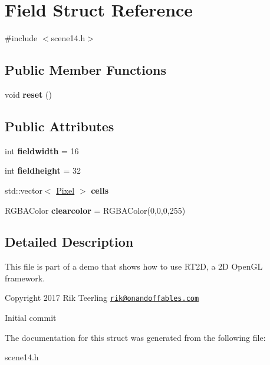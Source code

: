 \hypertarget{struct_field}{}\section{Field Struct Reference}
\label{struct_field}


{\ttfamily \#include $<$scene14.\+h$>$}

\subsection*{Public Member Functions}
\begin{DoxyCompactItemize}
\item 
\mbox{\label{struct_field_a63b8fdd184f4afe1adf143dbde54a57f}} 
void {\bfseries reset} ()
\end{DoxyCompactItemize}
\subsection*{Public Attributes}
\begin{DoxyCompactItemize}
\item 
\mbox{\label{struct_field_aa5e55573ae91de84b5b2a824cacde3c9}} 
int {\bfseries fieldwidth} = 16
\item 
\mbox{\label{struct_field_a2cac92d1bbaabf1fff016b26a5739844}} 
int {\bfseries fieldheight} = 32
\item 
\mbox{\label{struct_field_aa2e60e66a576bf6f5a447a476ebe2ec4}} 
std\+::vector$<$ \hyperlink{struct_pixel}{Pixel} $>$ {\bfseries cells}
\item 
\mbox{\label{struct_field_a5d846e0822373c2635406a1ed90201d9}} 
R\+G\+B\+A\+Color {\bfseries clearcolor} = R\+G\+B\+A\+Color(0,0,0,255)
\end{DoxyCompactItemize}


\subsection{Detailed Description}
This file is part of a demo that shows how to use R\+T2D, a 2D Open\+GL framework.


\begin{DoxyItemize}
\item Copyright 2017 Rik Teerling \href{mailto:rik@onandoffables.com}{\tt rik@onandoffables.\+com}
\begin{DoxyItemize}
\item Initial commit 
\end{DoxyItemize}
\end{DoxyItemize}

The documentation for this struct was generated from the following file\+:\begin{DoxyCompactItemize}
\item 
scene14.\+h\end{DoxyCompactItemize}

